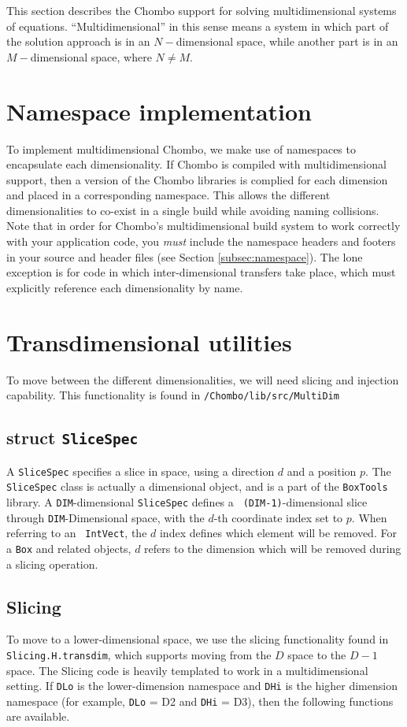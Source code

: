 This section describes the Chombo support for solving
multidimensional systems of equations.  ``Multidimensional'' in this
sense means a system in which part of the solution approach is in an
$N-$dimensional space, while another part is in an $M-$dimensional
space, where $N \neq M$. 


\section{Namespace implementation}
To implement multidimensional Chombo, we make use of namespaces to
encapsulate each dimensionality.  If Chombo is compiled with
multidimensional support, then a version of the Chombo libraries is
complied for each dimension and placed in a corresponding namespace.
This allows the different dimensionalities to co-exist in a single
build while avoiding naming collisions. Note that in order for
Chombo's multidimensional build system to work correctly with your application
code, you \emph{must} include the namespace headers and footers in 
your source and header files (see Section
\ref{subsec:namespace}). The lone exception is for code in which
inter-dimensional transfers take place, which must explicitly
reference each dimensionality by name. 


\section{Transdimensional utilities}
To move between the different dimensionalities, we will need slicing
and injection capability.  This functionality is found in {\verb#/Chombo/lib/src/MultiDim#}

\subsection{struct {\tt SliceSpec} }
A {\tt SliceSpec} specifies a slice in space, using a direction $d$
and a position $p$. The {\tt SliceSpec} class is actually a
dimensional object, and is a part of the {\tt BoxTools} library. A
{\tt DIM}-dimensional {\tt SliceSpec} defines a {\tt
  (DIM-1)}-dimensional slice through {\tt DIM}-Dimensional space, with
the $d$-th coordinate index set to $p$. When referring to an {\tt
  IntVect}, the $d$ index defines which element will be removed. For a
{\tt Box} and related objects, $d$ refers to the dimension which will
be removed during a slicing operation.

\subsection{Slicing}
To move to a lower-dimensional space, we use the slicing
functionality found in {\tt Slicing.H.transdim}, which supports moving
from the $D$ space to the $D-1$ space. The Slicing code is heavily
templated to work in a multidimensional setting. If {\tt DLo} is the
lower-dimension namespace and {\tt DHi} is the higher dimension
namespace (for example, {\tt DLo} = D2 and {\tt DHi} = D3), then the
following functions are available. 

